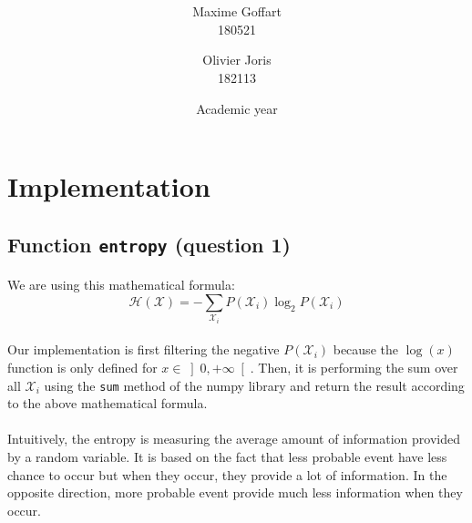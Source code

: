 \documentclass[a4paper, 11pt, oneside]{article}
\title{\ClassName\\\vspace*{0.8cm}\ProjectName\vspace{1cm}}
\author{Maxime Goffart \\180521 \and Olivier Joris\\182113}
\date{\vspace{1cm}Academic year \AcademicYear}
\begin{document}
\begin{titlingpage}
{\let\newpage\relax\maketitle}
\end{titlingpage}

\thispagestyle{empty}
\newpage




\section{Implementation}

\subsection{Function \texttt{entropy} (question 1)}

\paragraph{}We are using this mathematical formula: 
$$ \mathcal{H}(\mathcal{X}) = - \sum_{\mathcal{X}_i} P(\mathcal{X}_i) \log_2{P(\mathcal{X}_i)} $$

\paragraph{}Our implementation is first filtering the negative $P(\mathcal{X}_i)$ because 
the $\log(x)$ function is only defined for \(x \in \left]0, +\infty\right[\).
Then, it is performing the sum over all $\mathcal{X}_i$ using the \texttt{sum} method of the numpy library and return the result according to the above mathematical formula.

\paragraph{}Intuitively, the entropy is measuring the average amount of information provided by a random variable. It is based on the fact that less probable event have less chance to occur but when they occur, they provide a lot of information. In the opposite direction, more probable event provide much less information when they occur.
\end{document}
